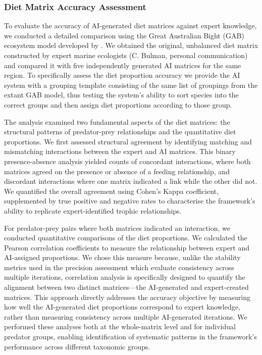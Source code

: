 \subsubsection{Diet Matrix Accuracy Assessment}
\label{sec:accuracy_assessment}
To evaluate the accuracy of AI-generated diet matrices against expert knowledge, we conducted a detailed comparison using the Great Australian Bight (GAB) ecosystem model developed by \citet{Fulton2018}. We obtained the original, unbalanced diet matrix constructed by expert marine ecologists (C. Bulman, personal communication) and compared it with five independently generated AI matrices for the same region. To specifically assess the diet proportion accuracy we provide the AI system with a grouping template consisting of the same list of groupings from the extant GAB model, thus testing the system's ability to sort species into the correct groups and then assign diet proportions according to those group. 

The analysis examined two fundamental aspects of the diet matrices: the structural patterns of predator-prey relationships and the quantitative diet proportions. We first assessed structural agreement by identifying matching and mismatching interactions between the expert and AI matrices. This binary presence-absence analysis yielded counts of concordant interactions, where both matrices agreed on the presence or absence of a feeding relationship, and discordant interactions where one matrix indicated a link while the other did not. We quantified the overall agreement using Cohen's Kappa coefficient, supplemented by true positive and negative rates to characterise the framework's ability to replicate expert-identified trophic relationships.

For predator-prey pairs where both matrices indicated an interaction, we conducted quantitative comparisons of the diet proportions. We calculated the Pearson correlation coefficients to measure the relationship between expert and AI-assigned proportions. We chose this measure because, unlike the stability metrics used in the precision assessment which evaluate consistency across multiple iterations, correlation analysis is specifically designed to quantify the alignment between two distinct matrices—the AI-generated and expert-created matrices. This approach directly addresses the accuracy objective by measuring how well the AI-generated diet proportions correspond to expert knowledge, rather than measuring consistency across multiple AI-generated iterations. We performed these analyses both at the whole-matrix level and for individual predator groups, enabling identification of systematic patterns in the framework's performance across different taxonomic groups.
